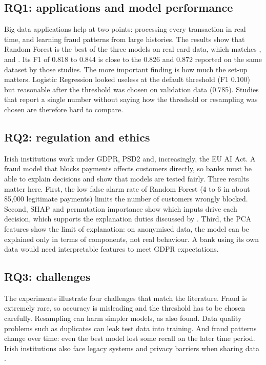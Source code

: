 \documentclass[12pt,a4paper]{article}
\begin{document}
\subsection{RQ1: applications and model performance}
Big data applications help at two points: processing every transaction in real time, and learning fraud patterns from large histories. The results show that Random Forest is the best of the three models on real card data, which matches \citet{albalawi2025enhancing}, \citet{andrade2025smote} and \citet{preciado2025banking}. Its F1 of 0.818 to 0.844 is close to the 0.826 and 0.872 reported on the same dataset by those studies. The more important finding is how much the set-up matters. Logistic Regression looked useless at the default threshold (F1 0.100) but reasonable after the threshold was chosen on validation data (0.785). Studies that report a single number without saying how the threshold or resampling was chosen are therefore hard to compare.

\subsection{RQ2: regulation and ethics}
Irish institutions work under GDPR, PSD2 and, increasingly, the EU AI Act. A fraud model that blocks payments affects customers directly, so banks must be able to explain decisions and show that models are tested fairly. Three results matter here. First, the low false alarm rate of Random Forest (4 to 6 in about 85{,}000 legitimate payments) limits the number of customers wrongly blocked. Second, SHAP and permutation importance show which inputs drive each decision, which supports the explanation duties discussed by \citet{horobets2025aml}. Third, the PCA features show the limit of explanation: on anonymised data, the model can be explained only in terms of components, not real behaviour. A bank using its own data would need interpretable features to meet GDPR expectations.

\subsection{RQ3: challenges}
The experiments illustrate four challenges that match the literature. Fraud is extremely rare, so accuracy is misleading and the threshold has to be chosen carefully. Resampling can harm simpler models, as \citet{ma2026leakage} also found. Data quality problems such as duplicates can leak test data into training. And fraud patterns change over time: even the best model lost some recall on the later time period. Irish institutions also face legacy systems and privacy barriers when sharing data \citep{elumilade2025leveraging, bian2025review}.
\end{document}
